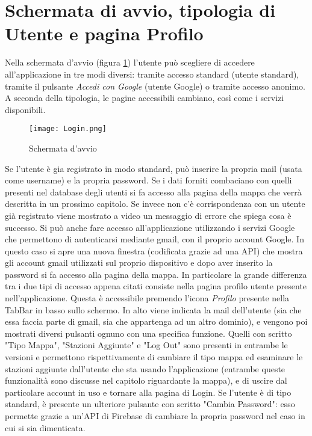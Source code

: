 \section{Schermata di avvio, tipologia di Utente e pagina Profilo}
Nella schermata d'avvio (figura \ref{login}) l'utente può scegliere di accedere
all'applicazione in tre modi diversi: tramite accesso standard (utente
standard), tramite il pulsante \textit{Accedi con Google} (utente Google) o
tramite accesso anonimo. A seconda della tipologia, le pagine accessibili
cambiano, così come i servizi disponibili.
\begin{figure}[h!]
    \centering
    \texttt{[image: Login.png]}
    \caption{Schermata d'avvio}
    \label{login}
\end{figure}
Se l'utente è gia registrato in modo standard, può inserire la propria mail
(usata come username) e la propria password. Se i dati forniti combaciano con
quelli presenti nel database degli utenti si fa accesso alla pagina della mappa
che verrà descritta in un prossimo capitolo. Se invece non c'è corrispondenza
con un utente già registrato viene mostrato a video un messaggio di errore che
spiega cosa è successo. \newline
Si può anche fare accesso all'applicazione utilizzando i servizi Google che
permettono di autenticarsi mediante gmail, con il proprio
account Google. In questo caso si apre una nuova finestra (codificata grazie ad
una API) che mostra gli account gmail utilizzati sul proprio dispositivo e dopo
aver inserito la password si fa accesso alla pagina della mappa. In particolare
la grande differenza tra i due tipi di accesso appena citati consiste nella
pagina profilo utente presente nell'applicazione. Questa è accessibile premendo
l'icona \textit{Profilo} presente nella TabBar in basso sullo schermo. In alto
viene indicata la mail dell'utente (sia che essa faccia parte di gmail, sia che appartenga
ad un altro dominio), e vengono poi mostrati diversi pulsanti ognuno con una
specifica funzione. Quelli con scritto "Tipo Mappa", "Stazioni Aggiunte" e "Log
Out" sono presenti in entrambe le versioni e permettono rispettivamente di
cambiare il tipo mappa ed esaminare le stazioni aggiunte dall'utente che sta
usando l'applicazione (entrambe queste funzionalità sono discusse nel capitolo
riguardante la mappa), e di uscire dal particolare account in uso e tornare alla
pagina di Login. Se l'utente è di tipo standard, è presente un ulteriore
pulsante con scritto "Cambia Password": esso permette grazie a un'API di
Firebase di cambiare la propria password nel caso in cui si sia dimenticata.

